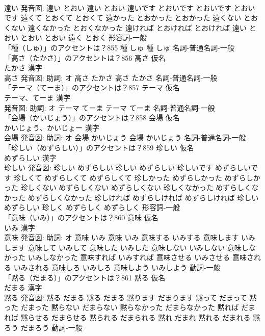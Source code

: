 \documentclass[8pt]{extreport}
\begin{document}
\begin{CJK}{UTF8}{min}
\\	遠い 発音図:	遠い とおい		遠い とおい 遠いです とおいです とおいです とおいです 遠くて とおくて とおくて 遠かった とおかった とおかった 遠くない とおくない 遠くなかった とおくなかった 遠ければ とおければ とおければ 遠い とおい とおい とおい 遠く とおく				形容詞-一般 
\\	「種（しゅ）」のアクセントは？855		種 しゅ		種 しゅ				名詞-普通名詞-一般 
\\	「高さ（たかさ）」のアクセントは？856	高さ 仮名　
\\	たかさ 漢字　
\\	高さ 発音図: 助詞: オ	高さ たかさ		高さ たかさ				名詞-普通名詞-一般 
\\	「テーマ（てーま）」のアクセントは？857	テーマ 仮名　
\\	テーマ、てーま 漢字　
\\	発音図: 助詞: オ	テーマ てーま		テーマ てーま				名詞-普通名詞-一般 
\\	「会場（かいじょう）」のアクセントは？858	会場 仮名　
\\	かいじょう、かいじょー 漢字　
\\	会場 発音図: 助詞: オ	会場 かいじょう		会場 かいじょう				名詞-普通名詞-一般 
\\	「珍しい（めずらしい）」のアクセントは？859	珍しい 仮名　
\\	めずらしい 漢字　
\\	珍しい 発音図:	珍しい めずらしい		珍しい めずらしい 珍しいです めずらしいです 珍しくて めずらしくて めずらしくて 珍しかった めずらしかった めずらしかった 珍しくない めずらしくない めずらしくない 珍しくなかった めずらしくなかった めずらしくなかった 珍しければ めずらしければ めずらしければ 珍しい めずらしい 珍しく めずらしく めずらしく				形容詞-一般 
\\	「意味（いみ）」のアクセントは？860	意味 仮名　
\\	いみ 漢字　
\\	意味 発音図: 助詞: オ	意味 いみ		意味 いみ 意味する いみする 意味します いみします 意味して いみして 意味した いみした 意味しない いみしない 意味しなかった いみしなかった 意味すれば いみすれば 意味させる いみさせる 意味される いみされる 意味しろ いみしろ 意味しよう いみしよう				動詞-一般 
\\	「黙る（だまる）」のアクセントは？861	黙る 仮名　
\\	だまる 漢字　
\\	黙る 発音図:	黙る だまる		黙る だまる 黙ります だまります 黙って だまって 黙った だまった 黙らない だまらない 黙らなかった だまらなかった 黙れば だまれば 黙らせる だまらせる 黙られる だまられる 黙れ だまれ 黙れる だまれる 黙ろう だまろう				動詞-一般 

\end{CJK}
\end{document}

